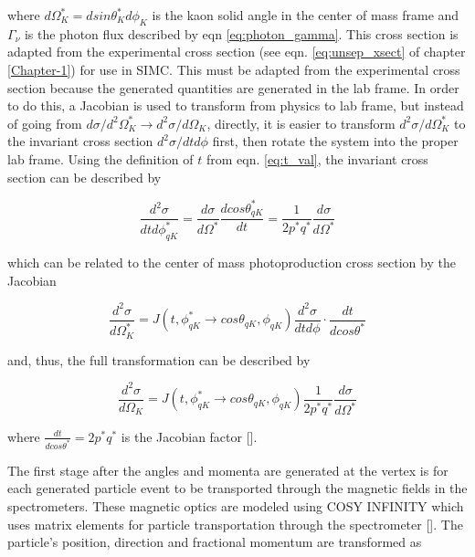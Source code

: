 \documentclass[
]{report}
\begin{document}
\noindent where \(d\Omega^*_{K}=dsin\theta^*_Kd\phi_K\) is the kaon
solid angle in the center of mass frame and \(\Gamma_{\nu}\) is the
photon flux described by eqn \ref{eq:photon_gamma}. This cross section
is adapted from the experimental cross section (see eqn.
\ref{eq:unsep_xsect} of chapter \ref{Chapter-1}) for use in SIMC. This
must be adapted from the experimental cross section because the
generated quantities are generated in the lab frame. In order to do
this, a Jacobian is used to transform from physics to lab frame, but
instead of going from
\(d\sigma/d^2\Omega^*_K\rightarrow d^2\sigma/d\Omega_K\), directly, it
is easier to transform \(d^2\sigma/d\Omega^*_K\) to the invariant cross
section \(d^2\sigma/dtd\phi\) first, then rotate the system into the
proper lab frame. Using the definition of \(t\) from eqn.
\ref{eq:t_val}, the invariant cross section can be described by

\begin{equation} 
  \frac{d^2\sigma}{dt d\phi^*_{qK}}=\frac{d\sigma}{d\Omega^*}\frac{d cos\theta^*_{qK}}{dt}=\frac{1}{2p^*q^*}\frac{d\sigma}{d\Omega^*}
  \label{eq:sig_ordertwo_tphi} 
\end{equation}

which can be related to the center of mass photoproduction cross section
by the Jacobian

\begin{equation} 
  \frac{d^2\sigma}{d\Omega^*_K}=J(t,\phi^*_{qK}\rightarrow cos\theta_{qK},\phi_{qK})\frac{d^2\sigma}{dtd\phi}\cdot\frac{dt}{d cos\theta^*}
  \label{eq:sig_ordertwo_virtual_physics} 
\end{equation}

\noindent and, thus, the full transformation can be described by

\begin{equation} 
  \frac{d^2\sigma}{d\Omega_K}=J(t,\phi^*_{qK}\rightarrow cos\theta_{qK},\phi_{qK})\frac{1}{2p^*q^*}\frac{d\sigma}{d\Omega^*}
  \label{eq:sig_ordertwo_virtual_lab} 
\end{equation}

\noindent where \(\frac{dt}{d cos\theta^*}=2p^*q^*\) is the Jacobian
factor {[}\cite{gaskell_longitudinal_2001}{]}.

\label{Chapter-4-2}

The first stage after the angles and momenta are generated at the vertex
is for each generated particle event to be transported through the
magnetic fields in the spectrometers. These magnetic optics are modeled
using COSY INFINITY which uses matrix elements for particle
transportation through the spectrometer {[}\cite{berz_code_1991}{]}. The
particle's position, direction and fractional momentum are transformed
as
\end{document}
